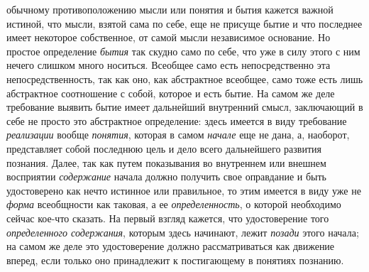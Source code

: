 обычному противоположению мысли или понятия и бытия кажется важной истиной,
что мысли, взятой сама по себе, еще не присуще бытие и что последнее имеет
некоторое собственное, от самой мысли независимое основание. Но простое
определение {\em бытия}
так скудно само по себе, что уже в силу этого с ним нечего
слишком много носиться. Всеобщее само есть непосредственно эта
непосредственность, так как оно, как абстрактное всеобщее, само тоже есть
лишь абстрактное соотношение с собой, которое и есть бытие. На самом же
деле требование выявить бытие имеет дальнейший внутренний
смысл, заключающий в себе не просто это абстрактное определение: здесь
имеется в виду требование {\em реализации} вообще
{\em понятия}, которая в самом {\em начале} еще не
дана, а, наоборот, представляет собой последнюю цель и дело всего
дальнейшего развития познания. Далее, так как путем показывания во
внутреннем или внешнем восприятии {\em содержание} начала
должно получить свое оправдание и быть удостоверено как нечто истинное или
правильное, то этим имеется в виду уже не
{\em форма} всеобщности
как таковая, а ее {\em определенность},
о которой необходимо сейчас кое-что сказать. На первый взгляд
кажется, что удостоверение того {\em определенного содержания},
которым здесь начинают, лежит {\em позади} этого начала;
на самом же деле это удостоверение должно рассматриваться как движение
вперед, если только оно принадлежит к постигающему в понятиях познанию.

